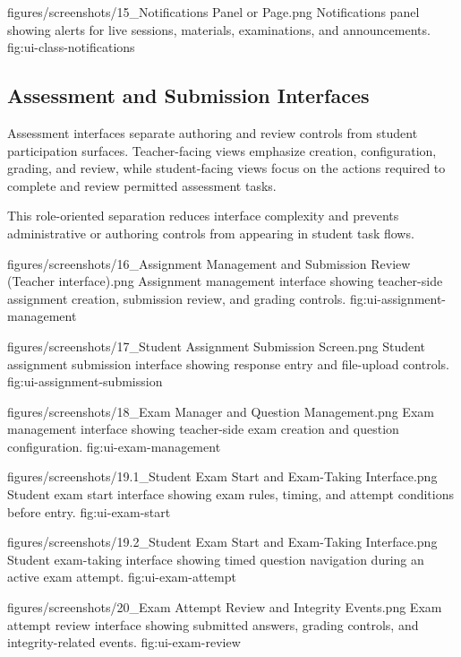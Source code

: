 \EduUiFigure
  {figures/screenshots/15_Notifications Panel or Page.png}
  {Notifications panel showing alerts for live sessions, materials, examinations, and announcements.}
  {fig:ui-class-notifications}

\clearpage

\subsection{Assessment and Submission Interfaces}

Assessment interfaces separate authoring and review controls from student
participation surfaces. Teacher-facing views emphasize creation, configuration,
grading, and review, while student-facing views focus on the actions required
to complete and review permitted assessment tasks.

This role-oriented separation reduces interface complexity and prevents
administrative or authoring controls from appearing in student task flows.

\EduUiFigure
  {figures/screenshots/16_Assignment Management and Submission Review (Teacher interface).png}
  {Assignment management interface showing teacher-side assignment creation, submission review, and grading controls.}
  {fig:ui-assignment-management}

\EduUiFigure
  {figures/screenshots/17_Student Assignment Submission Screen.png}
  {Student assignment submission interface showing response entry and file-upload controls.}
  {fig:ui-assignment-submission}

\EduUiFigure
  {figures/screenshots/18_Exam Manager and Question Management.png}
  {Exam management interface showing teacher-side exam creation and question configuration.}
  {fig:ui-exam-management}

\EduUiFigure
  {figures/screenshots/19.1_Student Exam Start and Exam-Taking Interface.png}
  {Student exam start interface showing exam rules, timing, and attempt conditions before entry.}
  {fig:ui-exam-start}

\EduUiFigure
  {figures/screenshots/19.2_Student Exam Start and Exam-Taking Interface.png}
  {Student exam-taking interface showing timed question navigation during an active exam attempt.}
  {fig:ui-exam-attempt}

\EduUiFigure
  {figures/screenshots/20_Exam Attempt Review and Integrity Events.png}
  {Exam attempt review interface showing submitted answers, grading controls, and integrity-related events.}
  {fig:ui-exam-review}

